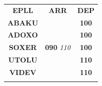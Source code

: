 
\centering
\begin{tabular}{|c|c|c|}
	\hhline{---}
	\rowcolor{white}
	\color{white}\cellcolor{vred}\textbf{EPLL} & \textbf{ARR}                               & \textbf{DEP}                  \\\hhline{---}
	\textbf{ABAKU}                             & \multirow{5}{*}{\textbf{090} \textit{110}} & \textbf{100}                  \\\hhline{-~-}
	\cellcolor{vpink}\textbf{ADOXO}            &                                            & \cellcolor{vpink}\textbf{100} \\\hhline{-~-}
	\textbf{SOXER}                             &                                            & \textbf{100}                  \\\hhline{-~-}
	\cellcolor{vpink}\textbf{UTOLU}            &                                            & \cellcolor{vpink}\textbf{110} \\\hhline{-~-}
	\textbf{VIDEV}                             &                                            & \textbf{110}                  \\\hhline{---}
\end{tabular}

